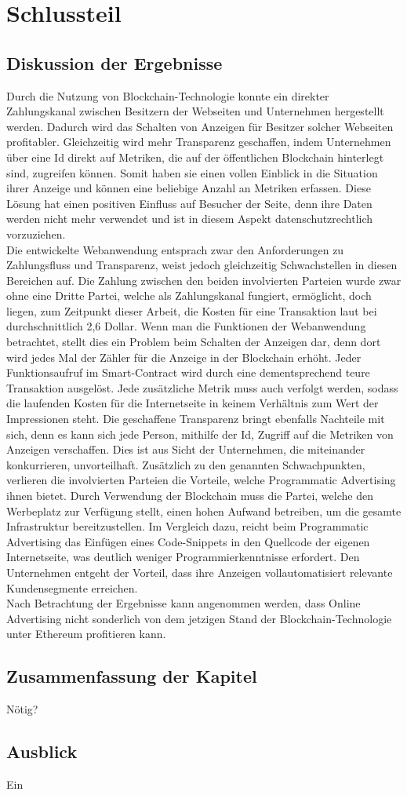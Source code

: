 \chapter{Schlussteil}
\section{Diskussion der Ergebnisse}
Durch die Nutzung von Blockchain-Technologie konnte ein direkter Zahlungskanal zwischen Besitzern der Webseiten und Unternehmen hergestellt werden. Dadurch wird das Schalten von Anzeigen für Besitzer solcher Webseiten profitabler. Gleichzeitig wird mehr Transparenz geschaffen, indem Unternehmen über eine Id direkt auf Metriken, die auf der öffentlichen Blockchain hinterlegt sind, zugreifen können. Somit haben sie einen vollen Einblick in die Situation ihrer Anzeige und können eine beliebige Anzahl an Metriken erfassen. Diese Lösung hat einen positiven Einfluss auf Besucher der Seite, denn ihre Daten werden nicht mehr verwendet und ist in diesem Aspekt datenschutzrechtlich vorzuziehen.\\

Die entwickelte Webanwendung entsprach zwar den Anforderungen zu Zahlungsfluss und Transparenz, weist jedoch gleichzeitig Schwachstellen in diesen Bereichen auf. Die Zahlung zwischen den beiden involvierten Parteien wurde zwar ohne eine Dritte Partei, welche als Zahlungskanal fungiert, ermöglicht, doch liegen, zum Zeitpunkt dieser Arbeit, die Kosten für eine Transaktion laut \cite{etherscan_2021} bei durchschnittlich 2,6 Dollar. Wenn man die Funktionen der Webanwendung betrachtet, stellt dies ein Problem beim Schalten der Anzeigen dar, denn dort wird jedes Mal der Zähler für die Anzeige in der Blockchain erhöht. Jeder Funktionsaufruf im Smart-Contract wird durch eine dementsprechend teure Transaktion ausgelöst. Jede zusätzliche Metrik muss auch verfolgt werden, sodass die laufenden Kosten für die Internetseite in keinem Verhältnis zum Wert der Impressionen steht.
Die geschaffene Transparenz bringt ebenfalls Nachteile mit sich, denn es kann sich jede Person, mithilfe der Id, Zugriff auf die Metriken von Anzeigen verschaffen. Dies ist aus Sicht der Unternehmen, die miteinander konkurrieren, unvorteilhaft. Zusätzlich zu den genannten Schwachpunkten, verlieren die involvierten Parteien die Vorteile, welche Programmatic Advertising ihnen bietet. Durch Verwendung der Blockchain muss die Partei, welche den Werbeplatz zur Verfügung stellt, einen hohen Aufwand betreiben, um die gesamte Infrastruktur bereitzustellen. Im Vergleich dazu, reicht beim Programmatic Advertising das Einfügen eines Code-Snippets in den Quellcode der eigenen Internetseite, was deutlich weniger Programmierkenntnisse erfordert. Den Unternehmen entgeht der Vorteil, dass ihre Anzeigen vollautomatisiert relevante Kundensegmente erreichen.\\

Nach Betrachtung der Ergebnisse kann angenommen werden, dass Online Advertising nicht sonderlich von dem jetzigen Stand der Blockchain-Technologie unter Ethereum profitieren kann.
\section{Zusammenfassung der Kapitel}
Nötig?
\section{Ausblick}
Ein 